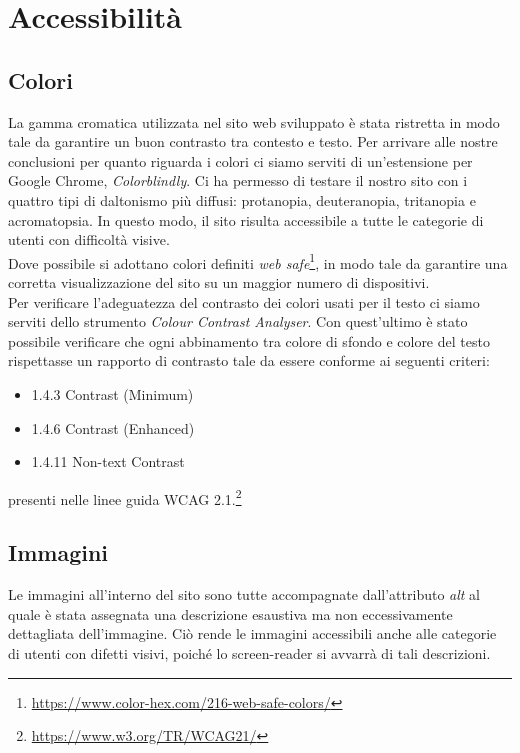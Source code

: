 \section{Accessibilità}
\subsection{Colori}
La gamma cromatica utilizzata nel sito web sviluppato è stata ristretta in modo tale da garantire un buon contrasto tra contesto e testo. Per arrivare alle nostre conclusioni per quanto riguarda i colori ci siamo
serviti di un'estensione per Google Chrome, \textit{Colorblindly}. Ci ha permesso di testare il nostro sito con i quattro tipi di daltonismo più diffusi: protanopia, deuteranopia, tritanopia e acromatopsia. In questo modo, il sito risulta accessibile a tutte le categorie di utenti con difficoltà visive.\\
Dove possibile si adottano colori definiti \textit{web safe}\footnote{\url{https://www.color-hex.com/216-web-safe-colors/}}, in modo tale da garantire una corretta visualizzazione del sito su un maggior numero di dispositivi.\\
Per verificare l'adeguatezza del contrasto dei colori usati per il testo ci siamo serviti dello strumento \textit{Colour Contrast Analyser}. Con quest'ultimo è stato possibile verificare che ogni abbinamento tra colore di sfondo e colore del testo rispettasse un rapporto di contrasto tale da essere conforme ai seguenti criteri:
\begin{itemize}
	\item 1.4.3 Contrast (Minimum)
	\item 1.4.6 Contrast (Enhanced)
	\item 1.4.11 Non-text Contrast
\end{itemize} 
presenti nelle linee guida WCAG 2.1.\footnote{\url{https://www.w3.org/TR/WCAG21/}} 

\subsection{Immagini}
Le immagini all'interno del sito sono tutte accompagnate dall'attributo \textit{alt} al quale è stata assegnata una descrizione esaustiva ma non eccessivamente dettagliata dell'immagine. Ciò rende le immagini accessibili anche alle categorie di utenti con difetti visivi, poiché lo screen-reader si avvarrà di tali descrizioni.

